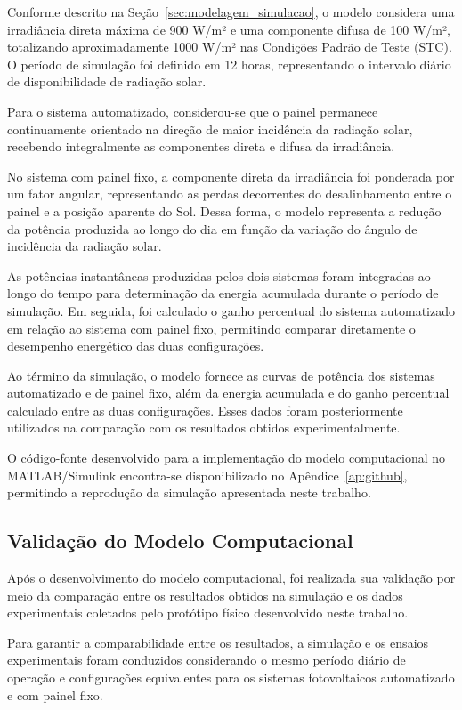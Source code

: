 Conforme descrito na Seção~\ref{sec:modelagem_simulacao}, o modelo considera uma irradiância direta máxima de 900 W/m² e uma componente difusa de 100 W/m², totalizando aproximadamente 1000 W/m² nas Condições Padrão de Teste (STC). O período de simulação foi definido em 12 horas, representando o intervalo diário de disponibilidade de radiação solar.

Para o sistema automatizado, considerou-se que o painel permanece continuamente orientado na direção de maior incidência da radiação solar, recebendo integralmente as componentes direta e difusa da irradiância.

No sistema com painel fixo, a componente direta da irradiância foi ponderada por um fator angular, representando as perdas decorrentes do desalinhamento entre o painel e a posição aparente do Sol. Dessa forma, o modelo representa a redução da potência produzida ao longo do dia em função da variação do ângulo de incidência da radiação solar.

As potências instantâneas produzidas pelos dois sistemas foram integradas ao longo do tempo para determinação da energia acumulada durante o período de simulação. Em seguida, foi calculado o ganho percentual do sistema automatizado em relação ao sistema com painel fixo, permitindo comparar diretamente o desempenho energético das duas configurações.

Ao término da simulação, o modelo fornece as curvas de potência dos sistemas automatizado e de painel fixo, além da energia acumulada e do ganho percentual calculado entre as duas configurações. Esses dados foram posteriormente utilizados na comparação com os resultados obtidos experimentalmente.

O código-fonte desenvolvido para a implementação do modelo computacional no MATLAB/Simulink encontra-se disponibilizado no Apêndice~\ref{ap:github}, permitindo a reprodução da simulação apresentada neste trabalho.

\subsection{Validação do Modelo Computacional}
\label{subsec:validacao_modelo}

Após o desenvolvimento do modelo computacional, foi realizada sua validação por meio da comparação entre os resultados obtidos na simulação e os dados experimentais coletados pelo protótipo físico desenvolvido neste trabalho.

Para garantir a comparabilidade entre os resultados, a simulação e os ensaios experimentais foram conduzidos considerando o mesmo período diário de operação e configurações equivalentes para os sistemas fotovoltaicos automatizado e com painel fixo.

